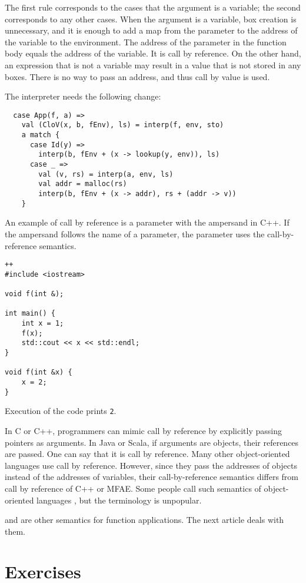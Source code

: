 The first rule corresponds to the cases that the argument is a variable; the second corresponds to any other cases. When the argument is a variable, box creation is unnecessary, and it is enough to add a map from the parameter to the address of the variable to the environment. The address of the parameter in the function body equals the address of the variable. It is call by reference. On the other hand, an expression that is not a variable may result in a value that is not stored in any boxes. There is no way to pass an address, and thus call by value is used.

The interpreter needs the following change:

\begin{verbatim}
  case App(f, a) =>
    val (CloV(x, b, fEnv), ls) = interp(f, env, sto)
    a match {
      case Id(y) =>
        interp(b, fEnv + (x -> lookup(y, env)), ls)
      case _ =>
        val (v, rs) = interp(a, env, ls)
        val addr = malloc(rs)
        interp(b, fEnv + (x -> addr), rs + (addr -> v))
    }
\end{verbatim}

An example of call by reference is a parameter with the ampersand in C++. If the ampersand follows the name of a parameter, the parameter uses the call-by-reference semantics.

\begin{verbatim}++
#include <iostream>

void f(int &);

int main() {
    int x = 1;
    f(x);
    std::cout << x << std::endl;
}

void f(int &x) {
    x = 2;
}
\end{verbatim}

Execution of the code prints \verb!2!.

In C or C++, programmers can mimic call by reference by explicitly passing pointers as arguments. In Java or Scala, if arguments are objects, their references are passed. One can say that it is call by reference. Many other object-oriented languages use call by reference. However, since they pass the addresses of objects instead of the addresses of variables, their call-by-reference semantics differs from call by reference of C++ or MFAE. Some people call such semantics of object-oriented languages , but the terminology is unpopular.

 and  are other semantics for function applications. The next article deals with them.

\section{Exercises}
